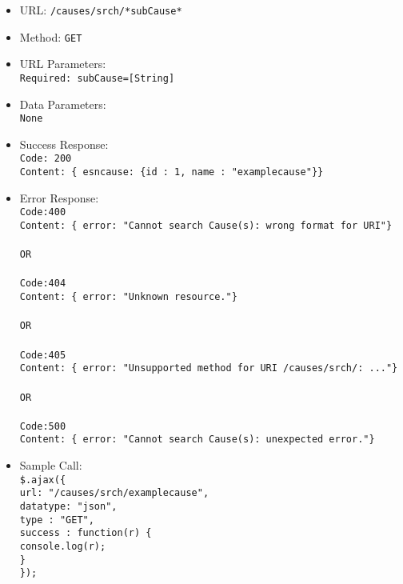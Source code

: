 \begin{itemize}
    \item URL: \texttt{/causes/srch/*subCause*}
    \item Method: \texttt{GET}
    \item URL Parameters: \texttt{\\Required: subCause=[String] }
    \item Data Parameters: \texttt{\\None}
    \item Success Response: \texttt{\\Code: 200 \\Content: \{ esncause: \{id : 1, name : "examplecause"\}\}} 
    \item Error Response: \texttt{\\Code:400 \\Content: \{ error: "Cannot search Cause(s): wrong format for URI"\}
                                \\\\OR \\\\Code:404 \\Content: \{ error: "Unknown resource."\}
                                 \\\\OR \\\\Code:405 \\Content: \{ error: "Unsupported method for URI /causes/srch/: ..."\}
                                  \\\\OR \\\\Code:500 \\Content: \{ error: "Cannot search Cause(s): unexpected error."\}}
    \item Sample Call: \texttt{\\\$.ajax(\{
                        \\ \mbox{\texttt{}} \mbox{\texttt{}} \mbox{\texttt{}} \mbox{\texttt{}} url: "/causes/srch/examplecause",
                        \\ \mbox{\texttt{}} \mbox{\texttt{}} \mbox{\texttt{}} \mbox{\texttt{}} datatype: "json",
                        \\ \mbox{\texttt{}} \mbox{\texttt{}} \mbox{\texttt{}} \mbox{\texttt{}} type : "GET",
                        \\ \mbox{\texttt{}} \mbox{\texttt{}} \mbox{\texttt{}} \mbox{\texttt{}} success : function(r) \{
                        \\ \mbox{\texttt{}} \mbox{\texttt{}} \mbox{\texttt{}} \mbox{\texttt{}} console.log(r);
                        \\ \mbox{\texttt{}} \mbox{\texttt{}} \mbox{\texttt{}} \mbox{\texttt{}} \}
                        \\ \});}
\end{itemize}

